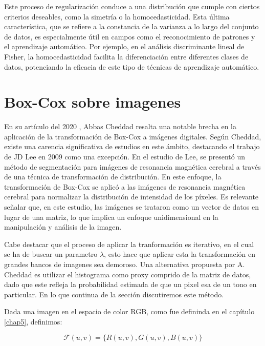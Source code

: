     Este proceso de regularizaci\'on conduce a una distribuci\'on que cumple con ciertos criterios deseables, como la simetr\'ia o la homocedasticidad. Esta \'ultima caracter\'istica, que se refiere a la constancia de la varianza a lo largo del conjunto de datos, es especialmente \'util en campos como el reconocimiento de patrones y el aprendizaje autom\'atico. Por ejemplo, en el an\'alisis discriminante lineal de Fisher, la homocedasticidad facilita la diferenciaci\'on entre diferentes clases de datos, potenciando la eficacia de este tipo de t\'ecnicas de aprendizaje autom\'atico.


    \section[]{Box-Cox sobre imagenes} 

    En su art\'iculo del 2020 \cite{boxcoximg}, Abbas Cheddad resalta una notable brecha en la aplicaci\'on de la transformaci\'on de Box-Cox a im\'agenes digitales. Seg\'un Cheddad, existe una carencia significativa de estudios en este \'ambito, destacando el trabajo de JD Lee en 2009 como una excepci\'on\cite{lee2009mr}. En el estudio de Lee, se present\'o un m\'etodo de segmentaci\'on para im\'agenes de resonancia magn\'etica cerebral a trav\'es de una t\'ecnica de transformaci\'on de distribuci\'on. En este enfoque, la transformaci\'on de Box-Cox se aplic\'o a las im\'agenes de resonancia magn\'etica cerebral para normalizar la distribuci\'on de intensidad de los p\'ixeles. Es relevante se\~nalar que, en este estudio, las im\'agenes se trataron como un vector de datos en lugar de una matriz, lo que implica un enfoque unidimensional en la manipulaci\'on y an\'alisis de la imagen.

    Cabe destacar que el proceso de aplicar la tranformaci\'on es iterativo, en el cual se ha de buscar un parametro $\lambda$, esto hace que aplicar esta la transformaci\'on en grandes bancos de imagenes sea demoroso. Una alternativa propuesta por A. Cheddad \cite{boxcoximg} es utilizar el histograma como proxy comprido de la matriz de datos, dado que este refleja la probabilidad estimada de que un pixel esa de un tono en particular. En lo que continua de la secci\'on discutiremos este m\'etodo.

    Dada una imagen en el espacio de color RGB, como fue defininda en el cap\'itulo \ref{chap5}, definimos:
    
    $$
    \mathcal{F}(u, v)=\{R(u, v), G(u, v), B(u, v)\}
    $$

